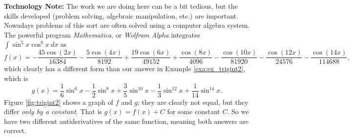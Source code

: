 \noindent\textbf{Technology Note:} The work we are doing here can be a bit tedious, but the skills developed (problem solving, algebraic manipulation, etc.) are important. Nowadays problems of this sort are often solved using a computer algebra system. The powerful program \textit{Mathematica}\textsuperscript{\textregistered}, or \textit{Wolfram Alpha} integrates $\int \sin^5x\cos^9x\ dx$ as \small$$f(x)=-\frac{45 \cos (2 x)}{16384}-\frac{5 \cos (4 x)}{8192}+\frac{19 \cos (6
   x)}{49152}+\frac{\cos (8 x)}{4096}-\frac{\cos (10 x)}{81920}-\frac{\cos (12
   x)}{24576}-\frac{\cos (14 x)}{114688},$$\normalsize
which clearly has a different form than our answer in Example \ref{exa:ex_trigint2}, which is
$$g(x)=\frac16\sin^6 x-\frac12\sin^8 x+\frac35\sin^{10} x-\frac13\sin^{12} x+\frac{1}{14}\sin^{14} x.$$ Figure \ref{fig:trigint2} shows a graph of $f$ and $g$; they are clearly not equal, but they differ \emph{only by a constant}. That is $g(x) = f(x) + C$ for some constant $C$. So we have two different antiderivatives of the same function, meaning both answers are correct. \\%

